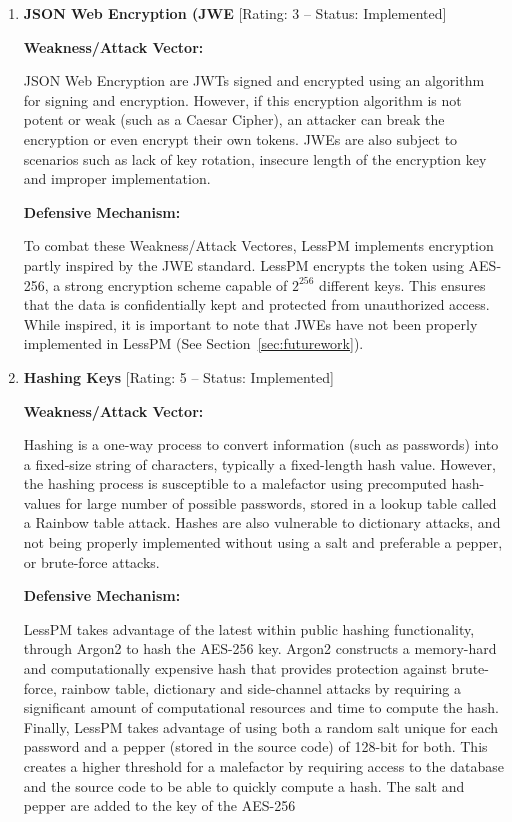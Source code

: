 \begin{enumerate}[label=$\blacktriangleright$]
  \item \textbf{JSON Web Encryption (JWE} [Rating: 3 -- Status: Implemented]

  \textbf{Weakness/Attack Vector:}

  JSON Web Encryption are JWTs signed and encrypted using an algorithm for
  signing and encryption.
  However, if this encryption algorithm is not potent or weak (such as a
  Caesar Cipher), an attacker can break the encryption or even encrypt their own
  tokens.
  JWEs are also subject to scenarios such as lack of key rotation, insecure
  length of the encryption key and improper implementation.

  \textbf{Defensive Mechanism:}

  To combat these Weakness/Attack Vectores, LessPM implements encryption partly inspired by
  the JWE standard.
  LessPM encrypts the token using AES-256, a strong encryption scheme capable
  of $2^{256}$ different keys.
  This ensures that the data is confidentially kept and protected from
  unauthorized access.
  While inspired, it is important to note that JWEs have not been properly
  implemented in LessPM (See Section~\ref{sec:futurework}).

  \item \textbf{Hashing Keys} [Rating: 5 -- Status: Implemented]

  \textbf{Weakness/Attack Vector:}

  Hashing is a one-way process to convert information (such as passwords)
  into a fixed-size string of characters, typically a fixed-length hash value.
  However, the hashing process is susceptible to a malefactor using
  precomputed hash-values for large number of possible passwords, stored in a
  lookup table called a Rainbow table attack.
  Hashes are also vulnerable to dictionary attacks, and not being properly
  implemented without using a salt and preferable a pepper, or brute-force
  attacks.

  \textbf{Defensive Mechanism:}

  LessPM takes advantage of the latest within public hashing functionality,
  through Argon2 to hash the AES-256 key.
  Argon2 constructs a memory-hard and computationally expensive hash that
  provides protection against brute-force, rainbow table, dictionary and
  side-channel attacks by requiring a significant amount of computational
  resources and time to compute the hash.
  Finally, LessPM takes advantage of using both a random salt unique for each
  password and a pepper (stored in the source code) of 128-bit for both.
  This creates a higher threshold for a malefactor by requiring access to the
  database and the source code to be able to quickly compute a hash.
  The salt and pepper are added to the key of the AES-256


\end{enumerate}
